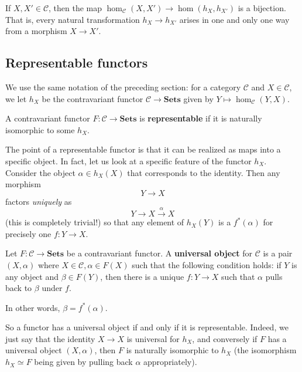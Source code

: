 \begin{theorem}
\label{yonedalemma}
If $X, X' \in \mathcal{C}$, then the map
$\hom_{\mathcal{C}}(X, X') \to \hom(h_X, h_{X'})$ is a bijection. That is,
every natural transformation $h_X \to h_{X'}$ arises in one and only one way
from a morphism $X \to X'$.
\end{theorem}


\begin{theorem}
\end{theorem}

\subsection{Representable functors}

We use  the same notation of the preceding section: for a category
$\mathcal{C}$ and $X \in \mathcal{C}$, we let $h_X$ be the contravariant
functor $\mathcal{C} \to \mathbf{Sets}$ given by $Y \mapsto
\hom_{\mathcal{C}}(Y, X)$.
\begin{definition}
A contravariant functor $F: \mathcal{C} \to \mathbf{Sets}$ is
\textbf{representable} if it is naturally isomorphic to some $h_X$.
\end{definition}

The point of a representable functor is that it can be realized as maps into a
specific object.
In fact, let us look at a specific feature of the functor $h_X$.
Consider the object $\alpha \in h_X(X)$ that corresponds to the identity.
Then any morphism
\[ Y \to X  \]
factors \emph{uniquely}
as \[ Y \to X \stackrel{\alpha}{\to } X  \]
(this is completely trivial!) so that
any element of $h_X(Y)$ is a $f^*(\alpha)$ for precisely one $f:  Y \to X$.

\begin{definition}
Let $F: \mathcal{C} \to \mathbf{Sets}$ be a contravariant functor. A
\textbf{universal object} for $\mathcal{C}$ is a pair $(X, \alpha)$ where $X
\in \mathcal{C}, \alpha \in F(X)$ such that the following condition holds:
if $Y$ is any object and $\beta \in F(Y)$, then there is a unique $f: Y \to X$
such that $\alpha$ pulls back to $\beta$ under $f$.

In other words, $\beta = f^*(\alpha)$.
\end{definition}

So a functor has a universal object if and only if it is representable.
Indeed, we just say that the identity $X \to X$ is universal for $h_X$, and
conversely if $F$ has a universal object $(X, \alpha)$, then $F$ is naturally
isomorphic to $h_X$ (the isomorphism $h_X \simeq F$ being given by pulling
back $\alpha$ appropriately).


